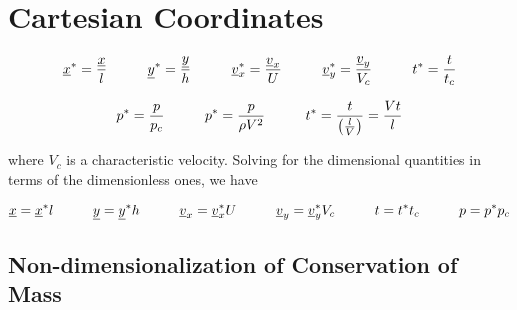 \section{Cartesian Coordinates}

\begin{equation*}
  \underline{x}^{*}=\frac{\underline{x}}{l}
  \hspace{0.4in}
  \underline{y}^{*}=\frac{\underline{y}}{h}
  \hspace{0.4in}
  \underline{v}_{x}^{*}=\frac{\underline{v}_{x}}{U}
  \hspace{0.4in}
  \underline{v}_{y}^{*}=\frac{\underline{v}_{y}}{V_{c}}
  \hspace{0.4in}
  t^{*}=\frac{t}{t_{c}}
\end{equation*}

\begin{equation*}
  p^{*}=\frac{p}{p_{c}}
  \hspace{0.4in}
  p^{*}=\frac{p}{\rho{}V^{2}}
  \hspace{0.4in}
  t^{*}=\frac{t}{\left(\frac{l}{V}\right)}=\frac{Vt}{l}
\end{equation*}

where $V_{c}$ is a characteristic velocity.
Solving for the dimensional quantities in terms of the dimensionless ones, we have

\begin{equation*}
  \underline{x}=\underline{x}^{*}l
  \hspace{0.4in}
  \underline{y}=\underline{y}^{*}h
  \hspace{0.4in}
  \underline{v}_{x}=\underline{v}_{x}^{*}U
  \hspace{0.4in}
  \underline{v}_{y}=\underline{v}_{y}^{*}V_{c}
  \hspace{0.4in}
  t=t^{*}t_{c}
  \hspace{0.4in}
  p=p^{*}p_{c}
\end{equation*}

\subsection{Non-dimensionalization of Conservation of Mass}

